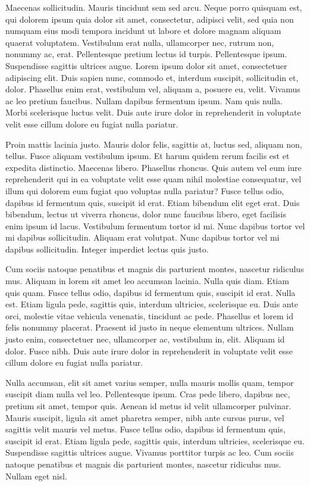 Maecenas sollicitudin. Mauris tincidunt sem sed arcu. Neque porro quisquam est, qui dolorem ipsum quia dolor sit amet, consectetur, adipisci velit, sed quia non numquam eius modi tempora incidunt ut labore et dolore magnam aliquam quaerat voluptatem. Vestibulum erat nulla, ullamcorper nec, rutrum non, nonummy ac, erat. Pellentesque pretium lectus id turpis. Pellentesque ipsum. Suspendisse sagittis ultrices augue. Lorem ipsum dolor sit amet, consectetuer adipiscing elit. Duis sapien nunc, commodo et, interdum suscipit, sollicitudin et, dolor. Phasellus enim erat, vestibulum vel, aliquam a, posuere eu, velit. Vivamus ac leo pretium faucibus. Nullam dapibus fermentum ipsum. Nam quis nulla. Morbi scelerisque luctus velit. Duis aute irure dolor in reprehenderit in voluptate velit esse cillum dolore eu fugiat nulla pariatur.

Proin mattis lacinia justo. Mauris dolor felis, sagittis at, luctus sed, aliquam non, tellus. Fusce aliquam vestibulum ipsum. Et harum quidem rerum facilis est et expedita distinctio. Maecenas libero. Phasellus rhoncus. Quis autem vel eum iure reprehenderit qui in ea voluptate velit esse quam nihil molestiae consequatur, vel illum qui dolorem eum fugiat quo voluptas nulla pariatur? Fusce tellus odio, dapibus id fermentum quis, suscipit id erat. Etiam bibendum elit eget erat. Duis bibendum, lectus ut viverra rhoncus, dolor nunc faucibus libero, eget facilisis enim ipsum id lacus. Vestibulum fermentum tortor id mi. Nunc dapibus tortor vel mi dapibus sollicitudin. Aliquam erat volutpat. Nunc dapibus tortor vel mi dapibus sollicitudin. Integer imperdiet lectus quis justo.

Cum sociis natoque penatibus et magnis dis parturient montes, nascetur ridiculus mus. Aliquam in lorem sit amet leo accumsan lacinia. Nulla quis diam. Etiam quis quam. Fusce tellus odio, dapibus id fermentum quis, suscipit id erat. Nulla est. Etiam ligula pede, sagittis quis, interdum ultricies, scelerisque eu. Duis ante orci, molestie vitae vehicula venenatis, tincidunt ac pede. Phasellus et lorem id felis nonummy placerat. Praesent id justo in neque elementum ultrices. Nullam justo enim, consectetuer nec, ullamcorper ac, vestibulum in, elit. Aliquam id dolor. Fusce nibh. Duis aute irure dolor in reprehenderit in voluptate velit esse cillum dolore eu fugiat nulla pariatur.

Nulla accumsan, elit sit amet varius semper, nulla mauris mollis quam, tempor suscipit diam nulla vel leo. Pellentesque ipsum. Cras pede libero, dapibus nec, pretium sit amet, tempor quis. Aenean id metus id velit ullamcorper pulvinar. Mauris suscipit, ligula sit amet pharetra semper, nibh ante cursus purus, vel sagittis velit mauris vel metus. Fusce tellus odio, dapibus id fermentum quis, suscipit id erat. Etiam ligula pede, sagittis quis, interdum ultricies, scelerisque eu. Suspendisse sagittis ultrices augue. Vivamus porttitor turpis ac leo. Cum sociis natoque penatibus et magnis dis parturient montes, nascetur ridiculus mus. Nullam eget nisl. 
